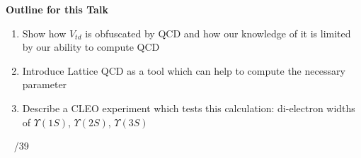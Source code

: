 \documentclass[landscape]{article}
\newenvironment{slide}[1][ ]{}{\mbox{ } \hfill \arabic{page}/39 \pagebreak}
\begin{document}

\begin{slide}
{\Huge \bf Outline for this Talk}

\vfill
\begin{center}
\begin{minipage}{0.8\linewidth} \Huge
\begin{enumerate}\setlength{\itemsep}{2 cm}

  \item Show how $V_{td}$ is obfuscated by QCD and how our knowledge
  of it is limited by our ability to compute QCD

  \item Introduce Lattice QCD as a tool which can help to compute the
  necessary parameter
  
  \item Describe a CLEO experiment which tests this calculation:
  di-electron widths of $\Upsilon(1S)$, $\Upsilon(2S)$, $\Upsilon(3S)$

\end{enumerate}
\end{minipage}
\end{center}
\vfill

\end{slide}

\end{document}
